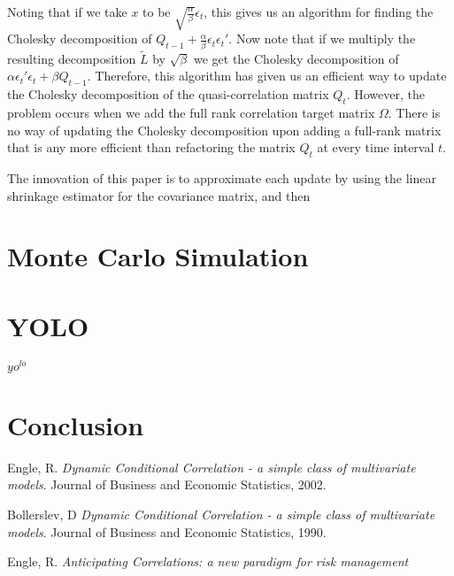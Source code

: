\documentclass{article} %
\numberwithin{equation}{section} %
\numberwithin{figure}{section} %
\numberwithin{table}{section} %
\begin{document}
Noting that if we take $x$ to be $\sqrt{\frac{\alpha}{\beta}}\epsilon_t$, this gives us an algorithm for finding the Cholesky decomposition of $Q_{t-1} + \frac{\alpha }{\beta}\epsilon_t \epsilon_t'$. Now note that if we multiply the resulting decomposition $\tilde{L}$ by $\sqrt{\beta}$ we get the Cholesky decomposition of $\alpha \epsilon_t' \epsilon_t + \beta Q_{t-1}$. Therefore, this algorithm has given us an efficient way to update the Cholesky decomposition of the quasi-correlation matrix $Q_t$. However, the problem occurs when we add the full rank correlation target matrix $\Omega$. There is no way of updating the Cholesky decomposition upon adding a full-rank matrix that is any more efficient than refactoring the matrix $Q_t$ at every time interval $t$.

The innovation of this paper is to approximate each update by using the linear shrinkage estimator for the covariance matrix, and then


\section{Monte Carlo Simulation}


\section{YOLO}

$yo^{lo}$


\section{Conclusion}

\begin{thebibliography}{9}
Engle, R.
\textit{Dynamic Conditional Correlation - a simple class of multivariate models}.
Journal of Business and Economic Statistics, 2002.

Bollerslev, D
\textit{Dynamic Conditional Correlation - a simple class of multivariate models}.
Journal of Business and Economic Statistics, 1990.

Engle, R.
\textit{Anticipating Correlations: a new paradigm for risk management}
\end{thebibliography}
\end{document}
